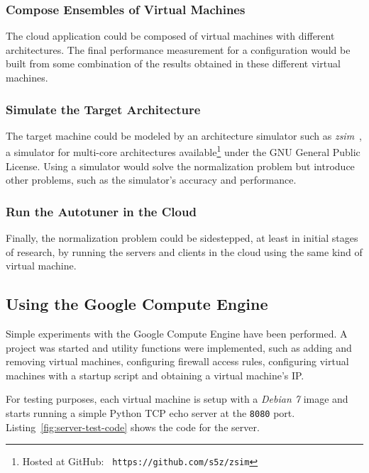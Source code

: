 \documentclass[a4paper, 12pt]{article}
\begin{document}
\subsubsection{Compose Ensembles of Virtual Machines}

The cloud application could be composed of virtual machines with different
architectures. The final performance measurement for a configuration would be
built from some combination of the results obtained in these different virtual
machines.

\subsubsection{Simulate the Target Architecture}

The target machine could be modeled by an architecture simulator such as
\emph{zsim}~\cite{sanchez2013zsim}, a simulator for multi-core architectures
available\footnote{Hosted at GitHub: \texttt{\scriptsize
https://github.com/s5z/zsim}} under the GNU General Public License.  Using a
simulator would solve the normalization problem but introduce other problems,
such as the simulator's accuracy and performance.

\subsubsection{Run the Autotuner in the Cloud}

Finally, the normalization problem could be sidestepped, at least in initial
stages of research, by running the servers and clients in the cloud using
the same kind of virtual machine.

\subsection{Using the Google Compute Engine} \label{sec:pwork}

Simple experiments with the Google Compute Engine have been performed. A
project was started and utility functions were implemented, such as
adding and removing virtual machines, configuring firewall access
rules, configuring virtual machines with a startup script and obtaining a
virtual machine's IP.

For testing purposes, each virtual machine is setup with a \emph{Debian 7}
image and starts running a simple Python TCP echo server at the
\texttt{\footnotesize 8080} port.  Listing~\ref{fig:server-test-code} shows the
code for the server.
\end{document}

